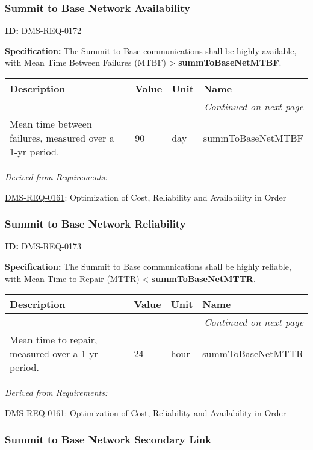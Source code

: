 \documentclass[SE,toc,lsstdraft]{lsstdoc}
\makeatletter
\newcommand{\paramname}[1]{\hspace{0pt}#1}
\newcommand{\unitname}[1]{\hspace{0pt}#1}
\newenvironment{parameters}[0]{%
\setlength\LTleft{0pt}
\setlength\LTright{\fill}
\begin{small}
\begin{longtable}[]{|p{0.5\textwidth}|l|p{0.6in}|p{1.74in}@{}|}

\hline \textbf{Description} & \textbf{Value} & \textbf{Unit} & \textbf{Name} \\ \hline
\endhead

\hline \multicolumn{4}{r}{\emph{Continued on next page}} \\
\endfoot

\hline\hline
\endlastfoot
}{%
\hline
\end{longtable}
\end{small}
}
\makeatother
\begin{document}
\subsubsection{Summit to Base Network Availability}

\label{DMS-REQ-0172}
\textbf{ID:} DMS-REQ-0172

\textbf{Specification:} The Summit to Base communications shall be highly available, with Mean Time Between Failures (MTBF) > \textbf{summToBaseNetMTBF}.





\begin{parameters}
Mean time between failures, measured over a 1-yr period.
&
90
&
\unitname{%
day
}
&
\paramname{%
summToBaseNetMTBF
} \\\hline
\end{parameters}




\emph{Derived from Requirements:}

\hyperref[DMS-REQ-0161]{DMS-REQ-0161}:
Optimization of Cost, Reliability and Availability in Order \newline


\subsubsection{Summit to Base Network Reliability}

\label{DMS-REQ-0173}
\textbf{ID:} DMS-REQ-0173

\textbf{Specification:} The Summit to Base communications shall be highly reliable, with Mean Time to Repair (MTTR) < \textbf{summToBaseNetMTTR}.





\begin{parameters}
Mean time to repair, measured over a 1-yr period.
&
24
&
\unitname{%
hour
}
&
\paramname{%
summToBaseNetMTTR
} \\\hline
\end{parameters}




\emph{Derived from Requirements:}

\hyperref[DMS-REQ-0161]{DMS-REQ-0161}:
Optimization of Cost, Reliability and Availability in Order \newline


\subsubsection{Summit to Base Network Secondary Link}
\end{document}
